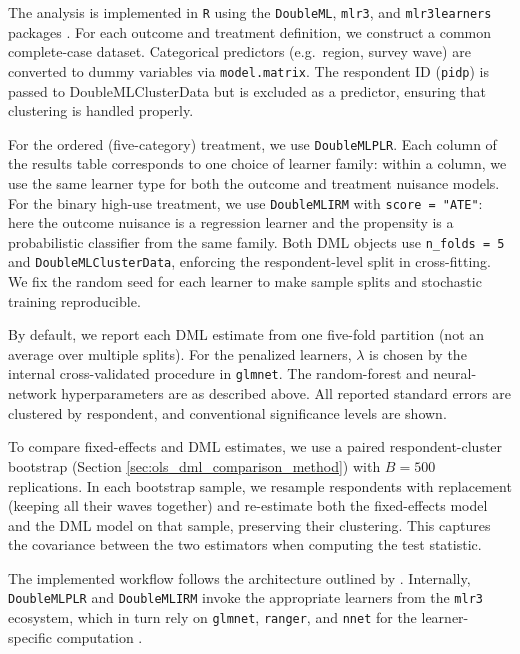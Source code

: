 \documentclass[11pt,oneside,a4paper]{book}
\begin{document}
The analysis is implemented in \texttt{R} using the \texttt{DoubleML}, \texttt{mlr3}, and \texttt{mlr3learners} packages \citep{bach2024doubleml,lang2019mlr3}. For each outcome and treatment definition, we construct a common complete-case dataset. Categorical predictors (e.g.\ region, survey wave) are converted to dummy variables via \texttt{model.matrix}. The respondent ID (\texttt{pidp}) is passed to DoubleMLClusterData but is excluded as a predictor, ensuring that clustering is handled properly.

For the ordered (five-category) treatment, we use \texttt{DoubleMLPLR}. Each column of the results table corresponds to one choice of learner family: within a column, we use the same learner type for both the outcome and treatment nuisance models. For the binary high-use treatment, we use \texttt{DoubleMLIRM} with \texttt{score = "ATE"}: here the outcome nuisance is a regression learner and the propensity is a probabilistic classifier from the same family. Both DML objects use \texttt{n\_folds = 5} and \texttt{DoubleMLClusterData}, enforcing the respondent-level split in cross-fitting. We fix the random seed for each learner to make sample splits and stochastic training reproducible.

By default, we report each DML estimate from one five-fold partition (not an average over multiple splits). For the penalized learners, \(\lambda\) is chosen by the internal cross-validated procedure in \texttt{glmnet}. The random-forest and neural-network hyperparameters are as described above. All reported standard errors are clustered by respondent, and conventional significance levels are shown.

To compare fixed-effects and DML estimates, we use a paired respondent-cluster bootstrap (Section \ref{sec:ols_dml_comparison_method}) with \(B=500\) replications. In each bootstrap sample, we resample respondents with replacement (keeping all their waves together) and re-estimate both the fixed-effects model and the DML model on that sample, preserving their clustering. This captures the covariance between the two estimators when computing the test statistic.

The implemented workflow follows the architecture outlined by \citet{bach2024doubleml}. Internally, \texttt{DoubleMLPLR} and \texttt{DoubleMLIRM} invoke the appropriate learners from the \texttt{mlr3} ecosystem, which in turn rely on \texttt{glmnet}, \texttt{ranger}, and \texttt{nnet} for the learner-specific computation \citep{friedman2010glmnet,wright2017ranger,venables2002mass}.
\end{document}
